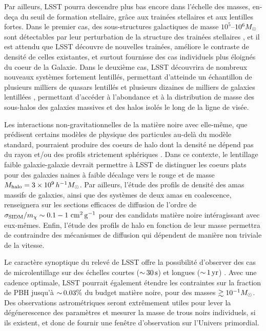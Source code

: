 \documentclass[12pt]{article}
\begin{document}
Par ailleurs, LSST pourra descendre plus bas encore dans l'échelle des masses, en-deça du seuil de formation stellaire, grâce aux trainées stellaires et aux lentilles fortes. Dans le premier cas, des sous-structures galactiques de masse $10^5$--$10^6 M_\odot$ sont détectables par leur perturbation de la structure des trainées stellaires \citep[][]{erkal2016,bovy:2017}, et il est attendu que LSST découvre de nouvelles trainées, améliore le contraste de densité de celles existantes, et surtout fournisse des cas individuels plus éloignés du coeur de la Galaxie. Dans le deuxième cas, LSST découvrira de nombreux nouveaux systèmes fortement lentillés, permettant d'atteinde un échantillon de plusieurs milliers de quasars lentillés \citep{O+M10} et plusieurs dizaines de milliers de galaxies lentillées \citep{Collett2015}, permettant d'accéder à l'abondance et à la distribution de masse des sous-halos des galaxies massives et des halos isolés le long de la ligne de visée.

Les interactions non-gravitationnelles de la matière noire avec elle-même, que prédisent certains modèles de physique des particules au-delà du modèle standard, pourraient produire des coeurs de halo dont la densité ne dépend pas du rayon \citep[coeurs `plats', ][]{Spergel:1999mh} et/ou des profils strictement sphériques \citep{Peter:2013}.
Dans ce contexte, le lentillage faible galaxie-galaxie devrait permettre à LSST de distinguer les coeurs plats pour des galaxies naines à faible décalage vers le rouge et de masse $M_\text{halo} = 3\times10^9\,h^{-1}M_\odot$. Par ailleurs, l'étude des profils de densité des amas massifs de galaxies, ainsi que des systèmes de deux amas en coalescence, renseignera sur les sections efficaces de diffusion de l'ordre de $\sigma_{\rm SIDM}/m_\chi \sim 0.1-1 \mathrm{\,\mathrm{\,cm}^2\mathrm{\,g}^{-1}}$ pour des candidats matière noire intéragissant avec eux-mêmes. Enfin, l'étude des profils de halo en fonction de leur masse permettra de contraindre des mécanismes de diffusion qui dépendent de manière non triviale de la vitesse. 

Le caractère synoptique du relevé de LSST offre la possibilité d'observer des cas de microlentillage sur des échelles courtes ($ {\sim}\, 30 \mathrm{\,s}$) et longues ($ {\sim}\,1 \mathrm{\,yr}$) \citep{1509.04899}. 
Avec une cadence optimale, LSST pourrait également étendre les contraintes sur la fraction de PBH jusqu'à $ {\sim}\,0.03\%$ du budget matière noire, pour des masses $\gtrsim 10^{-1} M_\odot$. Des observations astrométriques seront extrêmement utiles pour lever la dégénerescence des paramètres et mesurer la masse de trous noirs individuels, si ils existent, et donc de fournir une fenêtre d'observation sur l'Univers primordial.
\end{document}
